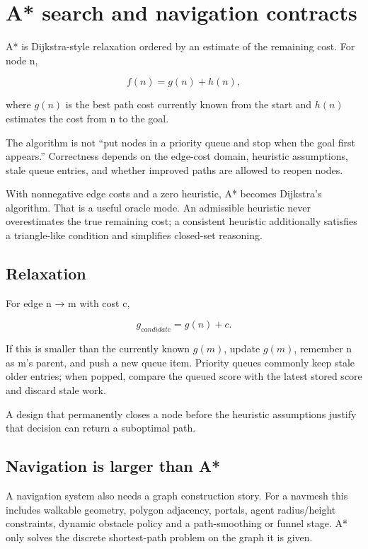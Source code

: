 \hypertarget{appendix-5803241aa1a5}{}\label{referencestart:appendix-5803241aa1a5}
\section{A* search and navigation contracts}\label{appendix-5803241aa1a5-a-search-and-navigation-contracts}

A* is Dijkstra-style relaxation ordered by an estimate of the remaining cost. For node n,

\[
f(n)=g(n)+h(n),
\]

where \(g(n)\) is the best path cost currently known from the start and \(h(n)\) estimates the cost from n to the goal.

The algorithm is not ``put nodes in a priority queue and stop when the goal first appears.'' Correctness depends on the edge-cost domain, heuristic assumptions, stale queue entries, and whether improved paths are allowed to reopen nodes.

With nonnegative edge costs and a zero heuristic, A* becomes Dijkstra's algorithm. That is a useful oracle mode. An admissible heuristic never overestimates the true remaining cost; a consistent heuristic additionally satisfies a triangle-like condition and simplifies closed-set reasoning.

\subsection{Relaxation}\label{appendix-5803241aa1a5-relaxation}

For edge n → m with cost c,

\[
g_{candidate}=g(n)+c.
\]

If this is smaller than the currently known \(g(m)\), update \(g(m)\), remember n as m's parent, and push a new queue item. Priority queues commonly keep stale older entries; when popped, compare the queued score with the latest stored score and discard stale work.

A design that permanently closes a node before the heuristic assumptions justify that decision can return a suboptimal path.

\subsection{Navigation is larger than A*}\label{appendix-5803241aa1a5-navigation-is-larger-than-a}

A navigation system also needs a graph construction story. For a navmesh this includes walkable geometry, polygon adjacency, portals, agent radius/height constraints, dynamic obstacle policy and a path-smoothing or funnel stage. A* only solves the discrete shortest-path problem on the graph it is given.

